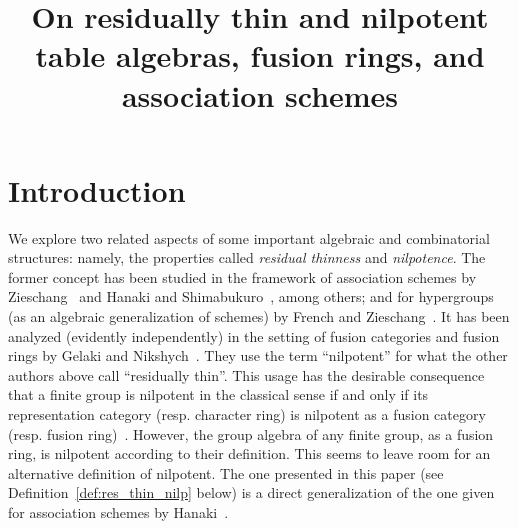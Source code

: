 \documentclass[ALCO,ThmDefs,Unicode,epreuves]{cedram}
\author{\firstname{Harvey} \middlename{I.} \lastname{Blau}}
\title[Residually thin and nilpotent table algebras]{On residually thin and nilpotent table algebras, fusion rings,
and association schemes}
\begin{document}
\maketitle


\section{Introduction}\label{sect1}
We explore two related aspects of
some important algebraic and combinatorial structures: namely, the
properties called \emph{residual thinness} and \emph{nilpotence}. The
former concept has been studied in the framework of association schemes
by Zieschang~\cite{Z1, Z2} and Hanaki and Shimabukuro~\cite{HS},
among others; and for hypergroups (as an algebraic generalization of
schemes) by French and Zieschang~\cite{FZ}. It has been analyzed
(evidently independently) in the setting of fusion categories and fusion
rings by Gelaki and Nikshych~\cite{GN}. They use
the term ``nilpotent'' for what the other authors above call ``residually
thin''. This usage has the desirable consequence that a finite group is
nilpotent in the classical sense if and only if its representation
category (resp. character ring) is nilpotent as a fusion category (resp.
fusion ring)~\cite [Remark~4.7]{GN}.
However, the group algebra of any finite group, as a fusion ring, is nilpotent according to their
definition. This seems to leave room for an alternative definition of
nilpotent. The one presented in this paper (see Definition~\ref{def:res_thin_nilp} below) is a direct generalization of the one
given for association schemes by Hanaki~\cite{H}. 
\end{document}
